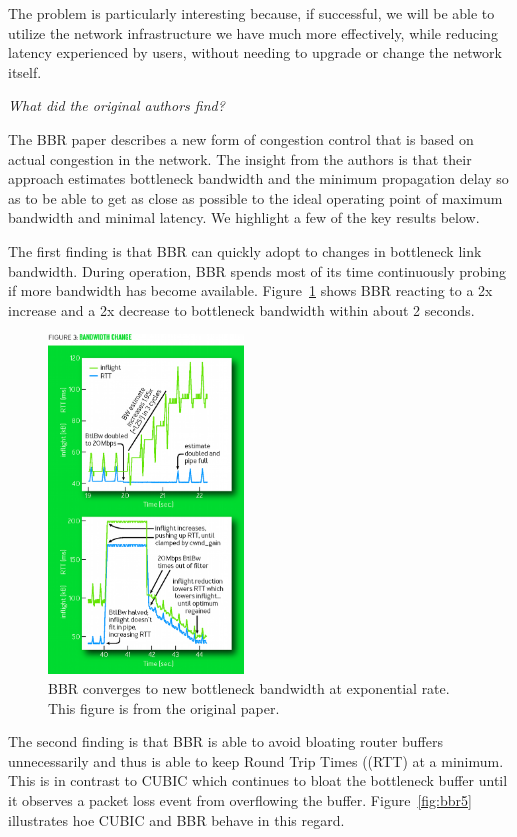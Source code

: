The problem is particularly interesting because, if successful, we will be able
to utilize the network infrastructure we have much more effectively, while
reducing latency experienced by users, without needing to upgrade or change
the network itself.

\emph{What did the original authors find?}

The BBR paper describes a new form of congestion control that is based on actual
congestion in the network. The insight from the authors is that their
approach estimates bottleneck bandwidth and the minimum propagation delay
so as to be able to get as close as possible to the ideal operating point of
maximum bandwidth and minimal latency. We highlight a few of the key
results below.

The first finding is that BBR can quickly adopt to changes in bottleneck link
bandwidth. During operation, BBR spends most of its time continuously probing
if more bandwidth has become available. Figure~\ref{fig:bbr3} shows BBR
reacting to a 2x increase and a 2x decrease to bottleneck bandwidth within
about 2 seconds.

\begin{figure}[h]
  \centering
  \includegraphics[height=9cm]{./img/bbr_fig3.png}
  \caption{BBR converges to new bottleneck bandwidth at exponential rate.
  This figure is from the original paper.}
  \label{fig:bbr3}
\end{figure}

The second finding is that BBR is able to avoid bloating router buffers
unnecessarily and thus is able to keep Round Trip Times ((RTT) at a minimum. This is in contrast to
CUBIC which continues to bloat the bottleneck buffer until it observes a
packet loss event from overflowing the buffer. Figure~\ref{fig:bbr5} illustrates
hoe CUBIC and BBR behave in this regard.

